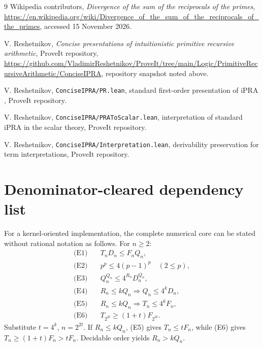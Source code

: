 \documentclass[11pt]{article}
\theoremstyle{definition}
\newcommand{\ipra}{\mathrm{iPRA}}
\newcommand{\ProdP}{Q}
\newcommand{\NumP}{R}
\newcommand{\DenE}{D}
\newcommand{\Fact}{F}
\newcommand{\NumH}{T}
\newcommand{\code}[1]{\texttt{#1}}
\begin{document}
\begin{thebibliography}{9}
Wikipedia contributors,
\emph{Divergence of the sum of the reciprocals of the primes},
\url{https://en.wikipedia.org/wiki/Divergence_of_the_sum_of_the_reciprocals_of_the_primes},
accessed 15 November 2026.

V. Reshetnikov,
\emph{Concise presentations of intuitionistic primitive recursive arithmetic},
ProveIt repository,
\url{https://github.com/VladimirReshetnikov/ProveIt/tree/main/Logic/PrimitiveRecursiveArithmetic/ConciseIPRA},
repository snapshot noted above.

V. Reshetnikov,
\code{ConciseIPRA/PR.lean}, standard first-order presentation of \(\ipra\),
ProveIt repository.

V. Reshetnikov,
\code{ConciseIPRA/PRAToScalar.lean}, interpretation of standard \(\ipra\) in
the scalar theory, ProveIt repository.

V. Reshetnikov,
\code{ConciseIPRA/Interpretation.lean}, derivability preservation for term
interpretations, ProveIt repository.
\end{thebibliography}

\appendix

\section{Denominator-cleared dependency list}

For a kernel-oriented implementation, the complete numerical core can be
stated without rational notation as follows.  For \(n\geq2\):
\begin{align*}
\text{(E1)}\quad& \NumH_n\DenE_n\leq\Fact_n\ProdP_n,\\
\text{(E2)}\quad& p^p\leq4(p-1)^p\quad(2\leq p),\\
\text{(E3)}\quad& \ProdP_n^{\ProdP_n}
                   \leq4^{\NumP_n}\DenE_n^{\ProdP_n},\\
\text{(E4)}\quad& \NumP_n\leq k\ProdP_n
                   \Longrightarrow \ProdP_n\leq4^k\DenE_n,\\
\text{(E5)}\quad& \NumP_n\leq k\ProdP_n
                   \Longrightarrow \NumH_n\leq4^k\Fact_n,\\
\text{(E6)}\quad& \NumH_{2^{2t}}\geq(1+t)\Fact_{2^{2t}}.
\end{align*}
Substitute \(t=4^k\), \(n=2^{2t}\).  If
\(\NumP_n\leq k\ProdP_n\), (E5) gives
\(\NumH_n\leq t\Fact_n\), while (E6) gives
\(\NumH_n\geq(1+t)\Fact_n>t\Fact_n\).  Decidable order yields
\(\NumP_n>k\ProdP_n\).
\end{document}
